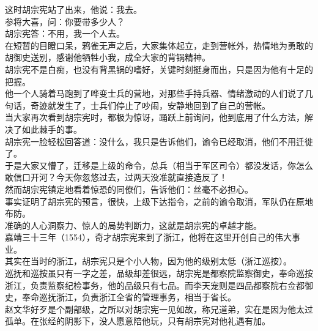 \begin{multicols}{\theparacolNo}
这时胡宗宪站了出来，他说：我去。\\

参将大喜，问：你要带多少人？\\

胡宗宪答：不用，我一个人去。\\

在短暂的目瞪口呆，鸦雀无声之后，大家集体起立，走到营帐外，热情地为勇敢的胡御史送别，感谢他牺牲小我，成全大家的背锅精神。\\

胡宗宪不是白痴，也没有背黑锅的嗜好，关键时刻挺身而出，只是因为他有十足的把握。\\

他一个人骑着马跑到了哗变士兵的营地，对那些手持兵器、情绪激动的人们说了几句话，奇迹就发生了，士兵们停止了吵闹，安静地回到了自己的营帐。\\

当大家再次看到胡宗宪时，都极为惊讶，踊跃上前询问，他到底用了什么方法，解决了如此棘手的事。\\

胡宗宪一脸轻松回答道：没什么，我只是告诉他们，谕令已经取消，他们不用迁徙了。\\

于是大家又懵了，迁移是上级的命令，总兵（相当于军区司令）都没发话，你怎么敢信口开河？今天你忽悠过去，过两天没准就直接造反了！\\

然而胡宗宪镇定地看着惊恐的同僚们，告诉他们：丝毫不必担心。\\

事实证明了胡宗宪的预言，很快，上级下达指令，之前的谕令取消，军队仍在原地布防。\\

准确的人心洞察力、惊人的局势判断力，这就是胡宗宪的卓越才能。\\

嘉靖三十三年（1554），奇才胡宗宪来到了浙江，他将在这里开创自己的伟大事业。\\

其实在当时的浙江，胡宗宪只是个小人物，因为他的级别太低（浙江巡按）。\\

巡抚和巡按虽只有一字之差，品级却差很远，胡宗宪是都察院监察御史，奉命巡按浙江，负责监察纪检事务，他的品级只有七品。而李天宠则是四品都察院右佥都御史，奉命巡抚浙江，负责浙江全省的管理事务，相当于省长。\\

赵文华好歹是个副部级，之所以对胡宗宪一见如故，称兄道弟，实在是因为他太过孤单。在张经的阴影下，没人愿意陪他玩，只有胡宗宪对他礼遇有加。\\


\end{multicols}
